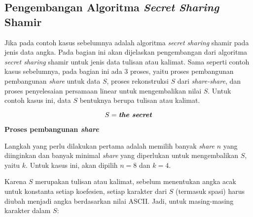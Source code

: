 \subsection{Pengembangan Algoritma \textit{Secret Sharing} Shamir}

Jika pada contoh kasus sebelumnya adalah algoritma \textit{secret sharing} shamir pada jenis data angka. Pada bagian ini akan dijelaskan pengembangan dari algoritma \textit{secret sharing} shamir untuk jenis data tulisan atau kalimat. Sama seperti contoh kasus sebelumnya, pada bagian ini ada 3 proses, yaitu proses pembangunan pembangunan \textit{share} untuk data \begin{math}S\end{math}, proses rekonstruksi \begin{math}S\end{math} dari \textit{share-share}, dan proses penyelesaian persamaan linear untuk mengembalikan nilai \begin{math}S\end{math}. Untuk contoh kasus ini, data \begin{math}S\end{math} bentuknya berupa tulisan atau kalimat.

\begin{displaymath}
	S = \text{\textbf{\textit{the secret}}}
\end{displaymath}

\begin{flushleft}
	\textbf{Proses pembangunan \textit{share}}
\end{flushleft}

Langkah yang perlu dilakukan pertama adalah memilih banyak \textit{share} \begin{math}n\end{math} yang diinginkan dan banyak minimal \textit{share} yang diperlukan untuk mengembalikan \begin{math}S\end{math}, yaitu \begin{math}k\end{math}. Untuk kasus ini, akan dipilih \begin{math}n=8\end{math} dan \begin{math}k=4\end{math}.

Karena \begin{math}S\end{math} merupakan tulisan atau kalimat, sebelum menentukan angka acak untuk konstanta setiap koefesien, setiap karakter dari \begin{math}S\end{math} (termasuk spasi) harus diubah menjadi angka berdasarkan nilai ASCII. Jadi, untuk masing-masing karakter dalam \begin{math}S\end{math}:

